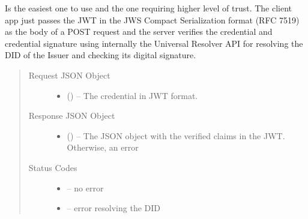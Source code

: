 \documentclass[letterpaper,10pt,english]{sphinxmanual}
\begin{document}
\begin{fulllineitems}
\label{\detokenize{privacycred:post--api-verifiable-credential-v1-verifiable-credential-validations}}
\sphinxAtStartPar
Is the easiest one to use and the one requiring higher level of trust. The client app just passes the JWT in the JWS Compact Serialization format (RFC 7519) as the body of a POST request and the server verifies the credential and credential signature using internally the Universal Resolver API for resolving the DID of the Issuer and checking its digital signature.
\begin{quote}\begin{description}
\item[{Request JSON Object}] \leavevmode\begin{itemize}
\item {} 
\sphinxAtStartPar
{} () – The credential in JWT format.

\end{itemize}

\item[{Response JSON Object}] \leavevmode\begin{itemize}
\item {} 
\sphinxAtStartPar
{} () – The JSON object with the verified claims in the JWT. Otherwise, an error

\end{itemize}

\item[{Status Codes}] \leavevmode\begin{itemize}
\item {} 
\sphinxAtStartPar
{} – no error

\item {} 
\sphinxAtStartPar
{} – error resolving the DID

\end{itemize}

\end{description}\end{quote}

\end{fulllineitems}
\end{document}
